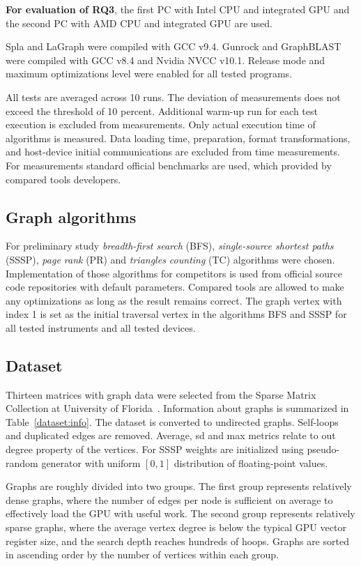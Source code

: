 \textbf{For evaluation of RQ3}, the first PC with Intel CPU and integrated GPU and the second PC with AMD CPU and integrated GPU are used.

Spla and LaGraph were compiled with GCC v9.4. Gunrock and GraphBLAST were compiled with GCC v8.4 and Nvidia NVCC v10.1.
Release mode and maximum optimizations level were enabled for all tested programs. 

All tests are averaged across 10 runs. The deviation of measurements does not exceed the threshold of 10 percent. Additional warm-up run for each test execution is excluded from measurements. Only actual execution time of algorithms is measured. Data loading time, preparation, format transformations, and host-device initial communications are excluded from time measurements. For measurements standard official benchmarks are used, which provided by compared tools developers.

\subsection{Graph algorithms}

For preliminary study \textit{breadth-first search} (BFS), \textit{single-source shortest paths} (SSSP), \textit{page rank} (PR) and \textit{triangles counting} (TC) algorithms were chosen.
Implementation of those algorithms for competitors is used from official source code repositories with default parameters. Compared tools are allowed to make any optimizations as long as the result remains correct.
The graph vertex with index 1 is set as the initial traversal vertex in the algorithms BFS and SSSP for all tested instruments and all tested devices.

\subsection{Dataset}

Thirteen matrices with graph data were selected from the Sparse Matrix Collection at University of Florida~\cite{dataset:sparse_matrix_collection}. 
Information about graphs is summarized in Table~\ref{dataset:info}. 
The dataset is converted to undirected graphs. 
Self-loops and duplicated edges are removed. 
Average, sd and max metrics relate to out degree property of the vertices.
For SSSP weights are initialized using pseudo-random generator with uniform $[0, 1]$ distribution of floating-point values.

Graphs are roughly divided into two groups. 
The first group represents relatively dense graphs, where the number of edges per node is sufficient on average to effectively load the GPU with useful work. 
The second group represents relatively sparse graphs, where the average vertex degree is below the typical GPU vector register size, and the search depth reaches hundreds of hoops. 
Graphs are sorted in ascending order by the number of vertices within each group.

